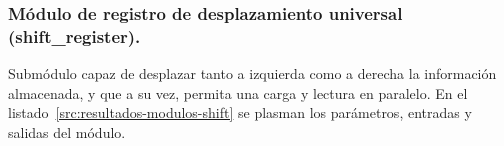 

\subsubsection{Módulo de registro de desplazamiento universal (shift\_register).}
Submódulo capaz de desplazar tanto a izquierda como a derecha la información almacenada, y que a su vez, permita una carga y lectura en paralelo. En el listado~\ref{src:resultados-modulos-shift} se plasman los parámetros, entradas y salidas del módulo.

